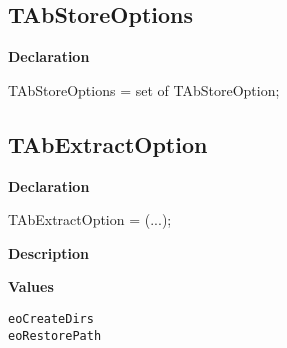 \documentclass{report}
\newif\ifpdf
\begin{document}
\subsection*{TAbStoreOptions}
\fi
\label{AbArcTyp-TAbStoreOptions}
\begin{list}{}{
\setlength{\itemindent}{0cm}
\setlength{\listparindent}{0cm}
\setlength{\leftmargin}{\evensidemargin}
\addtolength{\leftmargin}{\tmplength}
\settowidth{\labelsep}{X}
\addtolength{\leftmargin}{\labelsep}
\setlength{\labelwidth}{\tmplength}
}
\item[\textbf{Declaration}\hfill]
\ifpdf
\begin{flushleft}
\fi
\begin{ttfamily}
TAbStoreOptions =
    set of TAbStoreOption;\end{ttfamily}

\ifpdf
\end{flushleft}
\fi

\end{list}
\ifpdf
\subsection*{\large{\textbf{TAbExtractOption}}\normalsize\hspace{1ex}\hrulefill}
\else
\subsection*{TAbExtractOption}
\fi
\label{AbArcTyp-TAbExtractOption}
\begin{list}{}{
\setlength{\itemindent}{0cm}
\setlength{\listparindent}{0cm}
\setlength{\leftmargin}{\evensidemargin}
\addtolength{\leftmargin}{\tmplength}
\settowidth{\labelsep}{X}
\addtolength{\leftmargin}{\labelsep}
\setlength{\labelwidth}{\tmplength}
}
\item[\textbf{Declaration}\hfill]
\ifpdf
\begin{flushleft}
\fi
\begin{ttfamily}
TAbExtractOption = (...);\end{ttfamily}

\ifpdf
\end{flushleft}
\fi

\par
\item[\textbf{Description}]
 \item[\textbf{Values}]
\begin{description}
\item[\texttt{eoCreateDirs}]  
\item[\texttt{eoRestorePath}]  
\end{description}


\end{list}
\ifpdf
\end{document}
